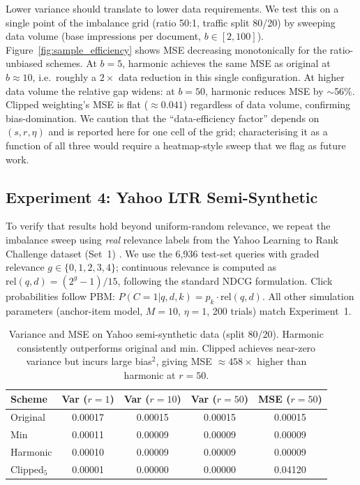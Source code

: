 \documentclass[sigconf]{acmart}
\begin{document}
Lower variance should translate to lower data requirements. We test this on a single point
of the imbalance grid (ratio 50:1, traffic split 80/20) by sweeping data volume
(base impressions per document, $b \in [2, 100]$). Figure~\ref{fig:sample_efficiency} shows
MSE decreasing monotonically for the ratio-unbiased schemes. At $b=5$, harmonic
achieves the same MSE as original at $b \approx 10$, i.e.\ roughly a $2\times$ data reduction
in this single configuration. At higher data volume the relative gap widens: at $b=50$,
harmonic reduces MSE by $\sim$56\%. Clipped weighting's MSE is flat ($\approx 0.041$)
regardless of data volume, confirming bias-domination. We caution that the
``data-efficiency factor'' depends on $(s, r, \eta)$ and is reported here for one cell of the
grid; characterising it as a function of all three would require a heatmap-style sweep that we
flag as future work.

\subsection{Experiment 4: Yahoo LTR Semi-Synthetic}
\label{sec:exp3}

To verify that results hold beyond uniform-random relevance, we repeat the imbalance sweep using \emph{real} relevance labels from the Yahoo Learning to Rank Challenge dataset (Set~1) \cite{chapelle2011yahoo}. We use the 6,936 test-set queries with graded relevance $g \in \{0,1,2,3,4\}$; continuous relevance is computed as $\mathrm{rel}(q,d) = (2^g - 1)/15$, following the standard NDCG formulation. Click probabilities follow PBM: $P(C=1|q,d,k) = p_k \cdot \mathrm{rel}(q,d)$. All other simulation parameters (anchor-item model, $M=10$, $\eta=1$, 200 trials) match Experiment~1.

\begin{table}[h]
    \small
    \centering
    \begin{tabular}{lcccc}
        \toprule
        Scheme & Var ($r=1$) & Var ($r=10$) & Var ($r=50$) & MSE ($r=50$) \\
        \midrule
        Original    & 0.00017 & 0.00015 & 0.00015 & 0.00015 \\
        Min         & 0.00011 & 0.00009 & 0.00009 & 0.00009 \\
        Harmonic    & 0.00010 & 0.00009 & 0.00009 & 0.00009 \\
        Clipped$_5$ & 0.00001 & 0.00000 & 0.00000 & 0.04120 \\
        \bottomrule
    \end{tabular}
    \caption{Variance and MSE on Yahoo semi-synthetic data (split 80/20). Harmonic consistently outperforms original and min. Clipped achieves near-zero variance but incurs large bias$^2$, giving MSE $\approx 458\times$ higher than harmonic at $r=50$.}
    \label{tab:yahoo_results}
\end{table}
\end{document}
